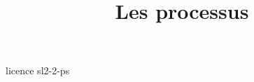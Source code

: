 \documentclass {beamer}
\title {Les processus}
\begin{document}
 {licence}
 {sl2-2-ps}
\end{document}
